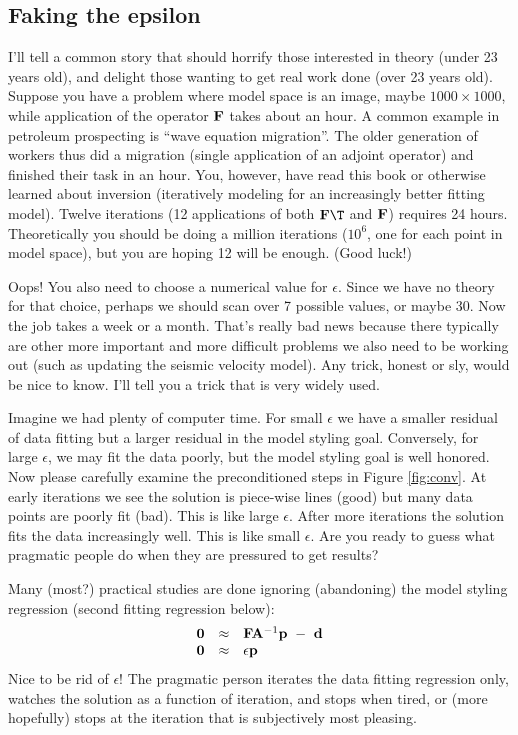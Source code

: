 
\subsection{Faking the epsilon}

I'll tell a common story that should horrify those interested in theory
(under 23 years old), and delight those wanting to get real work done
(over 23 years old).
Suppose you have a problem where
model space is an image, maybe $1000\times 1000$,
while application of the operator $\bold F$ takes about an hour.
A common example in petroleum prospecting is ``wave equation migration''.
The older generation of workers thus did a migration
(single application of an adjoint operator)
and finished their task in an hour.
You, however, have read this book or otherwise learned about inversion
(iteratively modeling for an increasingly better fitting model).
Twelve iterations (12 applications of both $\bold F\T$ and $\bold F$)
requires 24 hours.
Theoretically you should be doing a million iterations
($10^6$, one for each point in model space),
but you are hoping 12 will be enough. (Good luck!)
\par
Oops! You also need to choose a numerical value for $\epsilon$.
Since we have no theory for that choice, perhaps we should scan over 7 possible values,
or maybe 30.  Now the job takes a week or a month.
That's really bad news because
there typically are other more important and more difficult problems
we also need to be working out
(such as updating the seismic velocity model).
Any trick, honest or sly, would be nice to know.
I'll tell you a trick that is very widely used.
\par
Imagine we had plenty of computer time.
For small $\epsilon$ we have a smaller residual of data fitting but
a larger residual in the model styling goal.
Conversely, for large $\epsilon$, we may fit the data poorly,
but the model styling goal is well honored.
Now please carefully examine the preconditioned steps in Figure \ref{fig:conv}.
At early iterations we see the solution is piece-wise lines (good)
but many data points are poorly fit (bad).
This is like large $\epsilon$.
After more iterations the solution fits the data increasingly well.
This is like small $\epsilon$.
Are you ready to guess what pragmatic people do when they are pressured to get results?

\par
Many (most?) practical studies are done ignoring (abandoning)
the model styling regression (second fitting regression below):
$$
\begin{array}{lll}
\label{eq:main}
\bold 0 &\approx & \bold F \bold A^{-1} \bold p \ -\   \bold d \\
\bold 0 &\approx &           \epsilon   \bold p 
\end{array}
$$
Nice to be rid of $\epsilon$!
The pragmatic person iterates the data fitting regression only,
watches the solution as a function of iteration,
and stops when tired,
or (more hopefully) stops at the iteration that is subjectively most pleasing.


